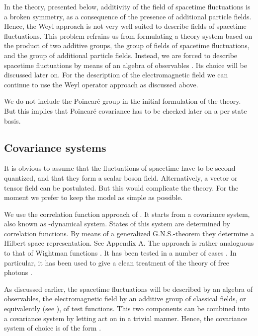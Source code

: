 \documentclass[12pt,a4paper]{article}
\def\Io{{\mathbb I}}
\begin{document}
In the theory, presented below, additivity of the field of spacetime
fluctuations is a broken symmetry, as a consequence of
the presence of additional particle fields. Hence, the Weyl approach
is not very well suited to describe fields of spacetime
fluctuations. This problem refrains us from formulating a theory
system based on the product of two additive groups, the group of
fields of spacetime fluctuations, and the group of additional
particle fields. Instead, we are forced to describe spacetime fluctuations
by means of an algebra of observables \coordHE{}. Its choice
will be discussed later on. For the description of
the electromagnetic field we can continue to use the Weyl
operator approach as discussed above.

We do not include the 
Poincar\'e group in the initial formulation of the theory. But 
this implies that Poincar\'e covariance has to be checked later 
on a per state basis.

\subsection{Covariance systems}

It is obvious to assume that the fluctuations of spacetime
have to be second-quantized, and that they form a scalar boson field.
Alternatively, a vector or tensor field can be postulated.
But this would complicate the theory. For the moment we prefer
to keep the model as simple as possible.

We use the correlation function approach of \cite {NK01}.
It starts from a covariance system, also known as \coordHE{}-dynamical
system. States of this system are determined by correlation functions.
By means of a generalized G.N.S.-theorem they determine
a Hilbert space representation. See Appendix A.
The approach is rather analoguous to that of Wightman functions \cite {WAS56}.
It has been tested in a number of cases \cite {NK00,NJ02}.
In particular, it has been used to give a clean treatment
of the theory of free photons \cite {NK02}.

As discussed earlier, the spacetime fluctuations will
be described by an algebra \coordHE{} of observables,
the electromagnetic field by an additive group \coordHE{} of classical
fields, or equivalently (see \cite {NK02}), of test functions.
This two components can be combined into a covariance
system by letting \coordHE{} act on \coordHE{}
in a trivial manner. Hence, the covariance system of
choice is of the form \myHighlight{$({\cal A}, G, \Io)$}\coordHE{}.
\end{document}
